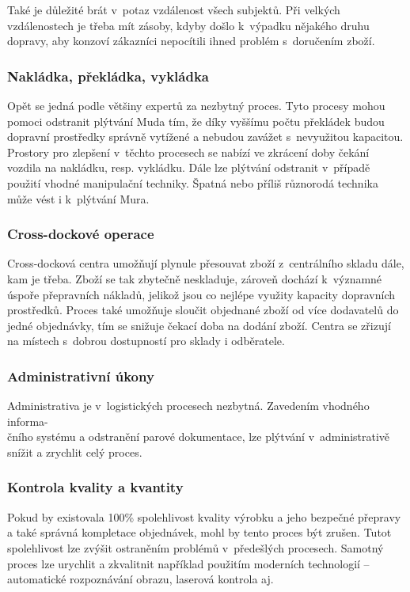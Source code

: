 Také je důležité brát v~potaz vzdálenost všech subjektů. Při velkých vzdálenostech je třeba mít zásoby, kdyby došlo k~výpadku nějakého druhu dopravy, aby konzoví zákazníci nepocítili ihned problém s~doručením zboží.

\subsubsection*{Nakládka, překládka, vykládka}

Opět se jedná podle většiny expertů za nezbytný proces. Tyto procesy mohou pomoci odstranit plýtvání Muda tím, že díky vyššímu počtu překládek budou dopravní prostředky správně vytížené a nebudou zavážet s~nevyužitou kapacitou. Prostory pro zlepšení v~těchto procesech se nabízí ve zkrácení doby čekání vozdila na nakládku, resp. vykládku. Dále lze plýtvání odstranit v~případě použití vhodné manipulační techniky. Špatná nebo příliš různorodá technika může vést i k~plýtvání Mura.

\subsubsection*{Cross-dockové operace}

Cross-docková centra umožňují plynule přesouvat zboží z~centrálního skladu dále, kam je třeba. Zboží se tak zbytečně neskladuje, zároveň dochází k~významné úspoře přepravních nákladů, jelikož jsou co nejlépe využity kapacity dopravních prostředků. Proces také umožňuje sloučit objednané zboží od více dodavatelů do jedné objednávky, tím se snižuje čekací doba na dodání zboží. Centra se zřizují na místech s~dobrou dostupností pro sklady i odběratele.

\subsubsection*{Administrativní úkony}

Administrativa je v~logistických procesech nezbytná. Zavedením vhodného informa-\\čního systému a odstranění parové dokumentace, lze plýtvání v~administrativě snížit a zrychlit celý proces. 

\subsubsection*{Kontrola kvality a kvantity}

Pokud by existovala 100\% spolehlivost kvality výrobku a jeho bezpečné přepravy a také správná kompletace objednávek, mohl by tento proces být zrušen. Tutot spolehlivost lze zvýšit ostraněním problémů v~předešlých procesech. Samotný proces lze urychlit a zkvalitnit například použitím moderních technologií -- automatické rozpoznávání obrazu, laserová kontrola aj.

